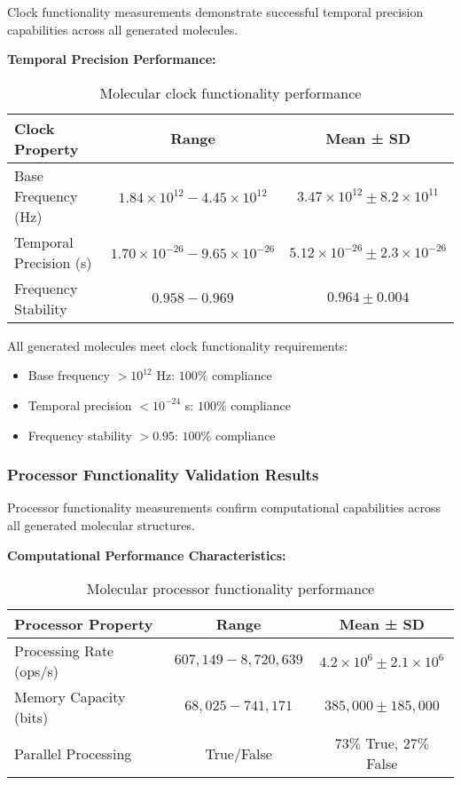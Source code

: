 \documentclass[12pt,a4paper]{article}
\begin{document}
Clock functionality measurements demonstrate successful temporal precision capabilities across all generated molecules.

\textbf{Temporal Precision Performance:}
\begin{table}[H]
\centering
\begin{tabular}{|l|c|c|}
\hline
\textbf{Clock Property} & \textbf{Range} & \textbf{Mean ± SD} \\
\hline
Base Frequency (Hz) & $1.84 \times 10^{12} - 4.45 \times 10^{12}$ & $3.47 \times 10^{12} \pm 8.2 \times 10^{11}$ \\
Temporal Precision (s) & $1.70 \times 10^{-26} - 9.65 \times 10^{-26}$ & $5.12 \times 10^{-26} \pm 2.3 \times 10^{-26}$ \\
Frequency Stability & $0.958 - 0.969$ & $0.964 \pm 0.004$ \\
\hline
\end{tabular}
\caption{Molecular clock functionality performance}
\end{table}

All generated molecules meet clock functionality requirements:
\begin{itemize}
\item Base frequency $> 10^{12}$ Hz: $100\%$ compliance
\item Temporal precision $< 10^{-24}$ s: $100\%$ compliance  
\item Frequency stability $> 0.95$: $100\%$ compliance
\end{itemize}

\subsubsection{Processor Functionality Validation Results}

Processor functionality measurements confirm computational capabilities across all generated molecular structures.

\textbf{Computational Performance Characteristics:}
\begin{table}[H]
\centering
\begin{tabular}{|l|c|c|}
\hline
\textbf{Processor Property} & \textbf{Range} & \textbf{Mean ± SD} \\
\hline
Processing Rate (ops/s) & $607,149 - 8,720,639$ & $4.2 \times 10^{6} \pm 2.1 \times 10^{6}$ \\
Memory Capacity (bits) & $68,025 - 741,171$ & $385,000 \pm 185,000$ \\
Parallel Processing & True/False & $73\%$ True, $27\%$ False \\
\hline
\end{tabular}
\caption{Molecular processor functionality performance}
\end{table}
\end{document}
